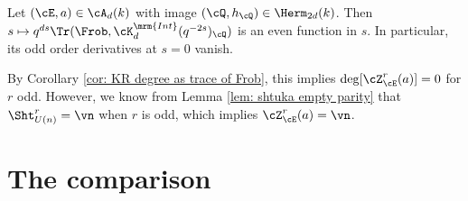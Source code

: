 \begin{cor}
\notready\label{cor:FE Int}
Let $(\cE,a)\in \cA_{d}(k)$ with image  $(\cQ,h_{\cQ})\in \Herm_{2d}(k)$. Then $s\mapsto q^{ds}\Tr(\Frob, \cK_d^{\mrm{Int}}(q^{-2s})_{\cQ})$ is an even function in $s$. In particular, its odd order derivatives at $s=0$ vanish.
\end{cor}
By Corollary \ref{cor: KR degree as trace of Frob}, this implies $\deg[\cZ^{r}_{\cE}(a)]=0$ for $r$ odd. However, we know from Lemma \ref{lem: shtuka empty parity} that $\Sht^{r}_{U(n)}=\vn$ when $r$ is odd, which implies $\cZ^{r}_{\cE}(a)=\vn$.





\part{The comparison}
